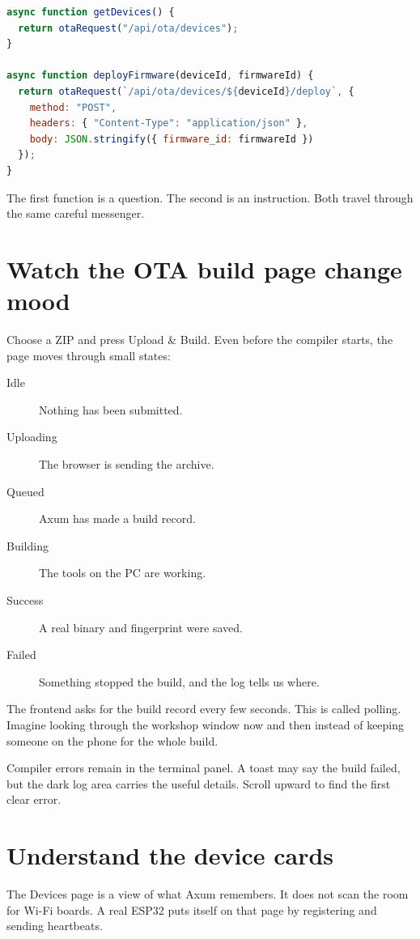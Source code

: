 \begin{lstlisting}[language=JavaScript]
async function getDevices() {
  return otaRequest("/api/ota/devices");
}

async function deployFirmware(deviceId, firmwareId) {
  return otaRequest(`/api/ota/devices/${deviceId}/deploy`, {
    method: "POST",
    headers: { "Content-Type": "application/json" },
    body: JSON.stringify({ firmware_id: firmwareId })
  });
}
\end{lstlisting}

The first function is a question. The second is an instruction. Both travel through the same careful messenger.

\section{Watch the OTA build page change mood}

Choose a ZIP and press Upload \& Build. Even before the compiler starts, the page moves through small states:

\begin{description}
  \item[Idle] Nothing has been submitted.
  \item[Uploading] The browser is sending the archive.
  \item[Queued] Axum has made a build record.
  \item[Building] The tools on the PC are working.
  \item[Success] A real binary and fingerprint were saved.
  \item[Failed] Something stopped the build, and the log tells us where.
\end{description}

The frontend asks for the build record every few seconds. This is called polling. Imagine looking through the workshop window now and then instead of keeping someone on the phone for the whole build.

Compiler errors remain in the terminal panel. A toast may say the build failed, but the dark log area carries the useful details. Scroll upward to find the first clear error.

\section{Understand the device cards}

The Devices page is a view of what Axum remembers. It does not scan the room for Wi-Fi boards. A real ESP32 puts itself on that page by registering and sending heartbeats.

